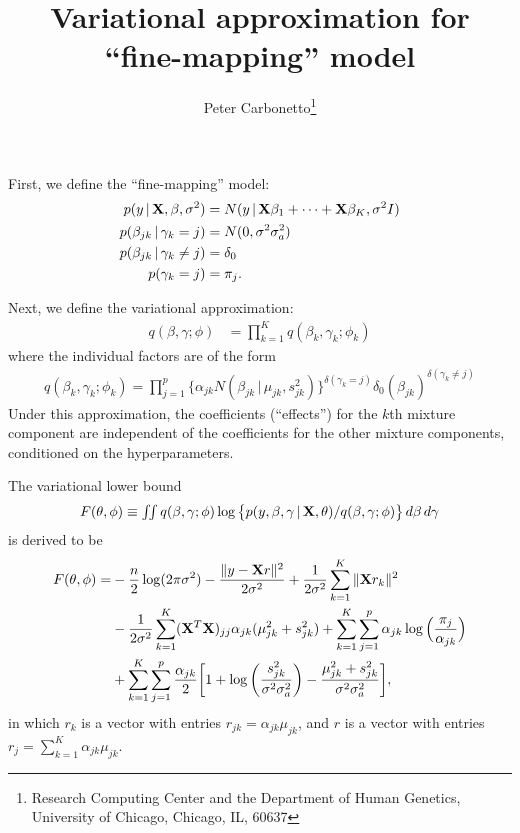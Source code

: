 \documentclass[final]{siamltex}
\title{Variational approximation for ``fine-mapping'' model}
\author{Peter Carbonetto\thanks{Research Computing Center and the
    Department of Human Genetics, University of Chicago, Chicago, IL,
    60637}}
\begin{document}
\maketitle

\noindent First, we define the ``fine-mapping'' model:
\begin{align*}
p(y \, |\, {\bf X}, \beta, \sigma^2) &=
  N(y \,|\, {\bf X}\beta_1 + \cdots + {\bf X}\beta_K, \sigma^2I) \\
p(\beta_{jk} \,|\, \gamma_k = j) &= N(0, \sigma^2 \sigma_a^2) \\
p(\beta_{jk} \,|\, \gamma_k \neq j) &= \delta_0 \\
p(\gamma_k = j) &= \pi_j.
\end{align*}

Next, we define the variational approximation:
\begin{align*}
q(\beta, \gamma; \phi) &= \prod_{k=1}^K q(\beta_k, \gamma_k; \phi_k)
\end{align*}
where the individual factors are of the form
\begin{align*}
q(\beta_k, \gamma_k; \phi_k) =
  \prod_{j=1}^p \big\{ \alpha_{jk}
    N(\beta_{jk} \,|\, \mu_{jk}, s_{jk}^2) \big\}^{\delta(\gamma_k = j)}
    \delta_0(\beta_{jk})^{\delta(\gamma_k \neq j)}
\end{align*}
Under this approximation, the coefficients (``effects'') for the $k$th
mixture component are independent of the coefficients for the other
mixture components, conditioned on the hyperparameters.

The variational lower bound
\begin{equation*}
F(\theta, \phi) \equiv \textstyle \iint q(\beta,
\gamma; \phi) \log \big\{ p(y, \beta, \gamma \,|\, {\bf X}, \theta) /
q(\beta, \gamma; \phi) \big\} \, d\beta \, d\gamma
\end{equation*}
is derived to be
\begin{align*}
F(\theta, \phi) =& -\frac{n}{2}\log(2\pi\sigma^2)
  - \frac{\|y - {\bf X}r\|^2}{2\sigma^2}
  + \frac{1}{2\sigma^2} \sum_{k=1}^K \|{\bf X}r_k \|^2 \\
  & - \frac{1}{2\sigma^2} \sum_{k=1}^K ({\bf X}^T{\bf X})_{jj}
    \alpha_{jk}(\mu_{jk}^2 + s_{jk}^2) 
  + \sum_{k=1}^K \sum_{j=1}^p \alpha_{jk}
    \log \Big(\frac{\pi_j}{\alpha_{jk}} \Big) \\
  & + \sum_{k=1}^K \sum_{j=1}^p \frac{\alpha_{jk}}{2}
    \bigg[1 + \log\bigg(\frac{s_{jk}^2}{\sigma^2\sigma_a^2}\bigg)
            - \frac{\mu_{jk}^2 + s_{jk}^2}{\sigma^2\sigma_a^2}\bigg],
\end{align*}
in which $r_k$ is a vector with entries $r_{jk} = \alpha_{jk} \mu_{jk}$,
and $r$ is a vector with entries $r_j = \sum_{k=1}^K \alpha_{jk}
\mu_{jk}$.
\end{document}
